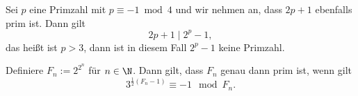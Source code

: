 \begin{thm}\autolabel
	Sei $p$ eine Primzahl mit $p \equiv -1 \bmod 4$ und wir nehmen an, dass $2p + 1$ ebenfalls prim ist. Dann gilt
	\[ 2p+1 \mid 2^p -1, \]
	das heißt ist $p>3$, dann ist in diesem Fall $2^p-1$ keine Primzahl.
\end{thm}

\begin{thm}[Pépin]\autolabel
	Definiere $F_n := 2^{2^n}$ für $n \in \N$. Dann gilt, dass $F_n$ genau dann prim ist, wenn gilt
	\[ 3^{\frac{1}{2}(F_n-1)} \equiv -1 \mod F_n. \]
\end{thm}